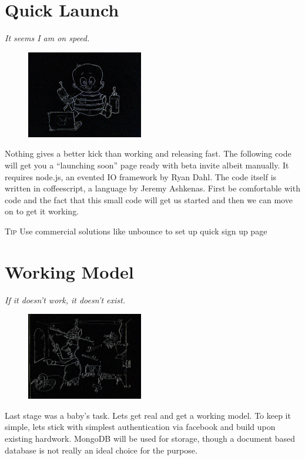 \documentclass[12pt]{book}
\begin{document}
\chapter{Quick Launch}
\begin{flushright}\textit{It seems I am on speed.}\end{flushright}

\begin{figure}
\begin{center}\includegraphics[width=2in]{org/art/getStartedHigh.png}\end{center}
\end{figure}

Nothing gives a better kick than working and releasing fast. The following code will get you a ``launching soon'' page ready with beta invite albeit manually. It requires node.js, an evented IO framework by Ryan Dahl. The code itself is written in coffeescript, a language by Jeremy Ashkenas.
First be comfortable with code and the fact that this small code will get us started and then we can move on to get it working.

\vspace{0.6cm}\vspace{0.6cm}

\colorbox{tipcolour}{\tiny \textsc{Tip} \small Use commercial solutions like unbounce to set up quick sign up page}


\chapter{Working Model}
\begin{flushright}\textit{If it doesn't work, it doesn't exist.}\end{flushright}

\begin{figure}
\begin{center}\includegraphics[width=2in]{org/art/workingModel.png}\end{center}
\end{figure}

Last stage was a baby's task. Lets get real and get a working model. To keep it simple, lets stick with simplest authentication via facebook and build upon existing hardwork. MongoDB will be used for storage, though a document based database is not really an ideal choice for the purpose. 
\end{document}
